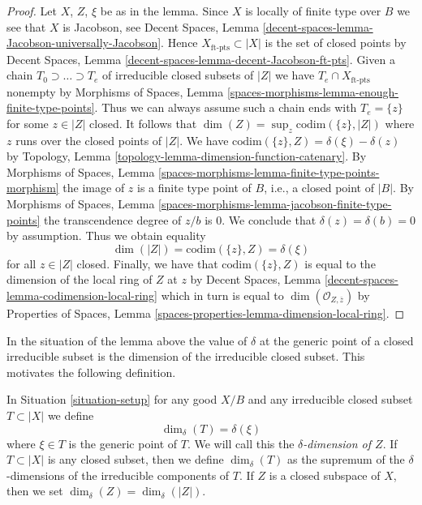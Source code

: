 \begin{proof}
Let $X$, $Z$, $\xi$ be as in the lemma.
Since $X$ is locally of finite type over $B$ we see that $X$ is Jacobson, see
Decent Spaces, Lemma
\ref{decent-spaces-lemma-Jacobson-universally-Jacobson}.
Hence $X_{\text{ft-pts}} \subset |X|$ is the set of closed points
by Decent Spaces, Lemma \ref{decent-spaces-lemma-decent-Jacobson-ft-pts}.
Given a chain $T_0 \supset \ldots \supset T_e$
of irreducible closed subsets of $|Z|$ we have
$T_e \cap X_{\text{ft-pts}}$ nonempty by
Morphisms of Spaces, Lemma
\ref{spaces-morphisms-lemma-enough-finite-type-points}.
Thus we can always assume such a chain ends
with $T_e = \{z\}$ for some $z \in |Z|$ closed.
It follows that $\dim(Z) = \sup_z \text{codim}(\{z\}, |Z|)$
where $z$ runs over the closed points of $|Z|$.
We have $\text{codim}(\{z\}, Z) = \delta(\xi) - \delta(z)$
by Topology, Lemma \ref{topology-lemma-dimension-function-catenary}.
By Morphisms of Spaces, Lemma
\ref{spaces-morphisms-lemma-finite-type-points-morphism}
the image of $z$ is a finite type point of $B$, i.e.,
a closed point of $|B|$. By
Morphisms of Spaces, Lemma
\ref{spaces-morphisms-lemma-jacobson-finite-type-points}
the transcendence degree of $z/b$ is $0$.
We conclude that $\delta(z) = \delta(b) = 0$ by assumption.
Thus we obtain equality
$$
\dim(|Z|) = \text{codim}(\{z\}, Z) = \delta(\xi)
$$
for all $z \in |Z|$ closed. Finally, we have that
$\text{codim}(\{z\}, Z)$ is equal to the dimension of the
local ring of $Z$ at $z$ by
Decent Spaces, Lemma \ref{decent-spaces-lemma-codimension-local-ring}
which in turn is equal to
$\dim(\mathcal{O}_{Z, \overline{z}})$ by
Properties of Spaces, Lemma \ref{spaces-properties-lemma-dimension-local-ring}.
\end{proof}

\noindent
In the situation of the lemma above the value of $\delta$
at the generic point of a closed irreducible subset
is the dimension of the irreducible closed subset.
This motivates the following definition.

\begin{definition}
\label{definition-delta-dimension}
In Situation \ref{situation-setup} for any good $X/B$
and any irreducible closed subset $T \subset |X|$ we define
$$
\dim_\delta(T) = \delta(\xi)
$$
where $\xi \in T$ is the generic point of $T$.
We will call this the {\it $\delta$-dimension of $Z$}.
If $T \subset |X|$ is any closed subset, then we define
$\dim_\delta(T)$ as the supremum of the $\delta$-dimensions
of the irreducible components of $T$.
If $Z$ is a closed subspace of $X$, then we set
$\dim_\delta(Z) = \dim_\delta(|Z|)$.
\end{definition}

